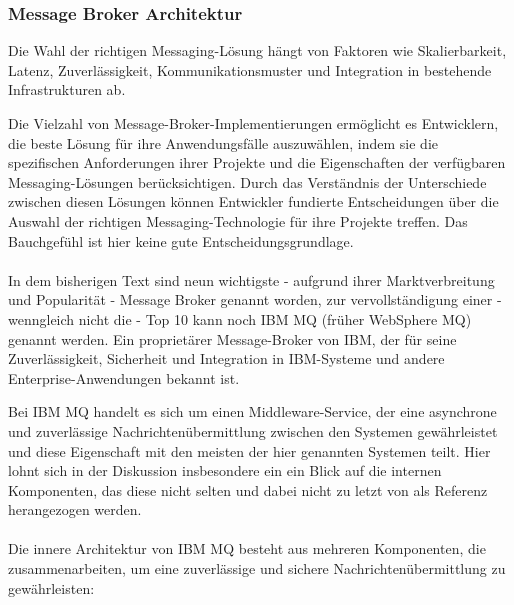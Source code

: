 \subsubsection{Message Broker Architektur}

Die Wahl der richtigen Messaging-Lösung hängt von Faktoren wie Skalierbarkeit, Latenz, Zuverlässigkeit, Kommunikationsmuster und Integration in bestehende Infrastrukturen ab.

Die Vielzahl von Message-Broker-Implementierungen ermöglicht es Entwicklern, die beste Lösung für ihre Anwendungsfälle auszuwählen, indem sie die spezifischen Anforderungen ihrer Projekte und die Eigenschaften der verfügbaren Messaging-Lösungen berücksichtigen. Durch das Verständnis der Unterschiede zwischen diesen Lösungen können Entwickler fundierte Entscheidungen über die Auswahl der richtigen Messaging-Technologie für ihre Projekte treffen. Das Bauchgefühl ist hier keine gute Entscheidungsgrundlage. 
\\\\
In dem bisherigen Text sind neun wichtigste - aufgrund ihrer Marktverbreitung und Popularität - Message Broker genannt worden, zur vervollständigung einer - wenngleich nicht die - Top 10 kann noch IBM MQ (früher WebSphere MQ) genannt werden. Ein proprietärer Message-Broker von IBM, der für seine Zuverlässigkeit, Sicherheit und Integration in IBM-Systeme und andere Enterprise-Anwendungen bekannt ist.

Bei IBM MQ handelt es sich um einen Middleware-Service, der eine asynchrone und zuverlässige Nachrichtenübermittlung zwischen den Systemen gewährleistet und diese Eigenschaft mit den meisten der hier genannten Systemen teilt. Hier lohnt sich in der Diskussion insbesondere ein ein Blick auf die internen Komponenten, das diese nicht selten und dabei nicht zu letzt von \cite{tanenbaum2017distributed} als Referenz herangezogen werden.
\\\\
Die innere Architektur von IBM MQ besteht aus mehreren Komponenten, die zusammenarbeiten, um eine zuverlässige und sichere Nachrichtenübermittlung zu gewährleisten:

